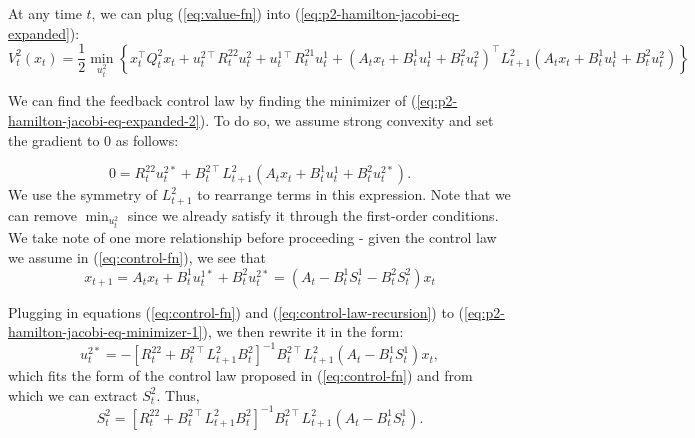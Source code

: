 \documentclass[11pt]{article}
\newcommand{\T}{\intercal}
\newcommand\dd[2]{\frac{\partial#1}{\partial#2}}
\begin{document}
At any time $t$, we can plug (\ref{eq:value-fn}) into (\ref{eq:p2-hamilton-jacobi-eq-expanded}):
\begin{equation}
\label{eq:p2-hamilton-jacobi-eq-expanded-2}
V^2_t(x_t) = \frac{1}{2} \min_{u^2_t} \left\{ x_t^\T Q^2_t x_t
    + u^{2\T}_t R^{22}_t u^2_t
    + u^{1\T}_t R^{21}_t u^1_t
    + \left(A_t x_t + B^{1}_t u^{1}_t + B^{2}_t u^{2}_t\right)^\T L^2_{t+1} \left( A_t x_t + B^{1}_t u^{1}_t + B^{2}_t u^{2}_t \right) \right\}
\end{equation}

We can find the feedback control law by finding the minimizer of (\ref{eq:p2-hamilton-jacobi-eq-expanded-2}). To do so, we assume strong convexity and set the gradient to 0 as follows:

\begin{equation}
\label{eq:p2-hamilton-jacobi-eq-minimizer-1}
0 = R^{22}_t u^{2*}_t + B^{2\T}_t L^2_{t+1} \left( A_t x_t + B^1_t u^1_t + B^2_t u^{2*}_t \right).
\end{equation}
We use the symmetry of $L^2_{t+1}$ to rearrange terms in this expression. Note that we can remove $\min_{u^2_t}$ since we already satisfy it through the first-order conditions. We take note of one more relationship before proceeding - given the control law we assume in (\ref{eq:control-fn}), we see that
\begin{equation}
\label{eq:control-law-recursion}
x_{t+1} = A_t x_t + B^{1}_t u^{1*}_t + B^{2}_t u^{2*}_t = (A_t - B^1_t S^1_t - B^2_t S^2_t)x_t
\end{equation}

Plugging in equations (\ref{eq:control-fn}) and (\ref{eq:control-law-recursion}) to (\ref{eq:p2-hamilton-jacobi-eq-minimizer-1}), we then rewrite it in the form:
\begin{equation}
\label{eq:u2-optimal}
u^{2*}_t = -\left[R^{22}_t + B^{2\T}_t L^2_{t+1} B^2_t\right]^{-1} B^{2\T}_t L^2_{t+1} \left( A_t - B^1_t S^1_t \right) x_t,
\end{equation}
which fits the form of the control law proposed in (\ref{eq:control-fn}) and from which we can extract $S^2_t$. Thus,
\begin{equation}
\label{eq:S2t-recursion}
S^2_t = \left[R^{22}_t + B^{2\T}_t L^2_{t+1} B^2_t\right]^{-1} B^{2\T}_t L^2_{t+1} \left( A_t - B^1_t S^1_t \right).
\end{equation}
\end{document}

